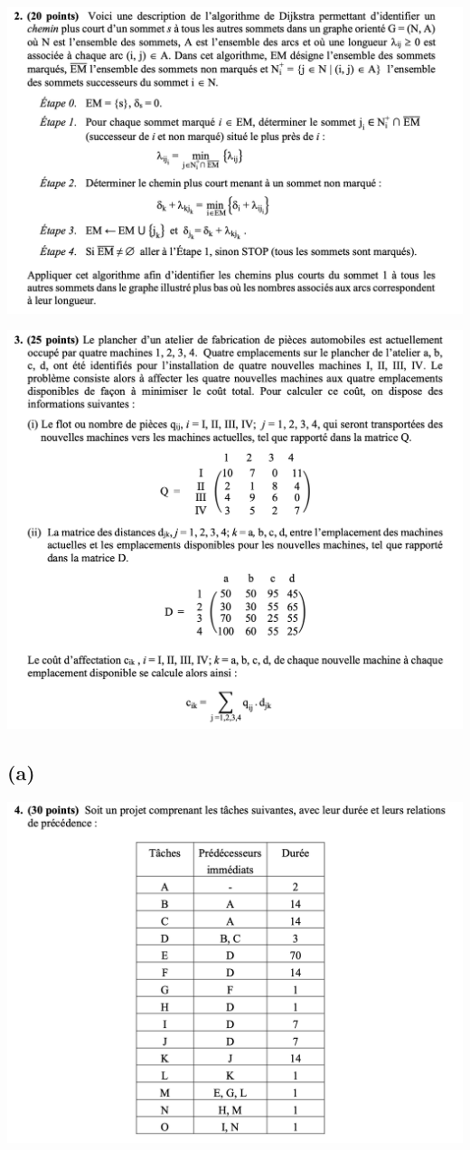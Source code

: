 \documentclass{article}
\begin{document}
\includegraphics[width=1 \textwidth]{num2} 
\pagebreak

\includegraphics[width=1 \textwidth]{num3}
\subsection*{(a)} 
\pagebreak

\includegraphics[width=1 \textwidth]{num4} 
\end{document}
